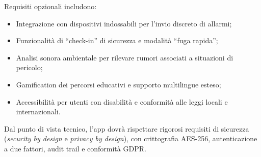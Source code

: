 \documentclass[a4paper,11pt]{article}
\begin{document}
Requisiti opzionali includono:
\begin{itemize}
    \item Integrazione con dispositivi indossabili per l'invio discreto di allarmi;
    \item Funzionalità di ``check-in'' di sicurezza e modalità ``fuga rapida'';
    \item Analisi sonora ambientale per rilevare rumori associati a situazioni di pericolo;
    \item Gamification dei percorsi educativi e supporto multilingue esteso;
    \item Accessibilità per utenti con disabilità e conformità alle leggi locali e internazionali.
\end{itemize}
Dal punto di vista tecnico, l'app dovrà rispettare rigorosi requisiti di sicurezza (\textit{security by design} e \textit{privacy by design}), con crittografia AES-256, autenticazione a due fattori, audit trail e conformità GDPR.
\end{document}
